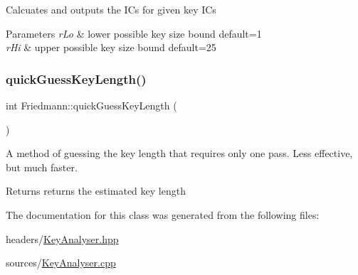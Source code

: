 Calcuates and outputs the I\+Cs for given key I\+Cs


\begin{DoxyParams}{Parameters}
{\em r\+Lo} & lower possible key size bound default=1 \\
\hline
{\em r\+Hi} & upper possible key size bound default=25 \\
\hline
\end{DoxyParams}
\mbox{\label{classFriedmann_a638777d8e78a6101c69e61208086d1bf}} 
\subsubsection{\texorpdfstring{quick\+Guess\+Key\+Length()}{quickGuessKeyLength()}}
{\footnotesize\ttfamily int Friedmann\+::quick\+Guess\+Key\+Length (\begin{DoxyParamCaption}{ }\end{DoxyParamCaption})}

A method of guessing the key length that requires only one pass. Less effective, but much faster.

\begin{DoxyReturn}{Returns}
returns the estimated key length 
\end{DoxyReturn}


The documentation for this class was generated from the following files\+:\begin{DoxyCompactItemize}
\item 
headers/\hyperlink{KeyAnalyser_8hpp}{Key\+Analyser.\+hpp}\item 
sources/\hyperlink{KeyAnalyser_8cpp}{Key\+Analyser.\+cpp}\end{DoxyCompactItemize}

